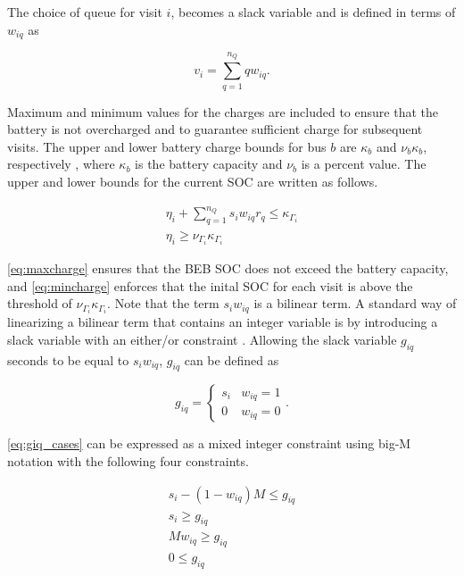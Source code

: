\documentclass[utf8]{FrontiersinHarvard}
\let\cite\citep                                       %
\begin{document}
The choice of queue for visit \(i\), becomes a slack variable and is defined in terms of \(w_{iq}\) as

\begin{equation}
    v_i = \sum_{q=1}^{n_Q} qw_{iq}.
\end{equation}

Maximum and minimum values for the charges are included to ensure that the battery is not overcharged and to guarantee
sufficient charge for subsequent visits. The upper and lower battery charge bounds for bus \(b\) are \(\kappa_b\) and \(\nu_b \kappa_b\),
respectively , where \(\kappa_b\) is the battery capacity and \(\nu_b\) is a percent value. The upper and lower bounds for the
current SOC are written as follows.

\begin{subequations}
    \label{subeq:pre_min_max}
\begin{align}
    \eta_i + \sum_{q=1}^{n_Q} s_i w_{iq} r_q \leq \kappa_{\Gamma_i} \label{eq:maxcharge}\\
    \eta_i \geq \nu_{\Gamma_i} \kappa_{\Gamma_i} \label{eq:mincharge}
\end{align}
\end{subequations}

\autoref{eq:maxcharge} ensures that the BEB SOC does not exceed the battery capacity, and \autoref{eq:mincharge}
enforces that the inital SOC for each visit is above the threshold of \(\nu_{\Gamma_i}\kappa_{\Gamma_i}\). Note that the term \(s_i w_{iq}\)
is a bilinear term. A standard way of linearizing a bilinear term that contains an integer variable is by introducing a
slack variable with an either/or constraint \cite{chen-2010-applied,rodriguez-2013-compar-asses}. Allowing the slack
variable \(g_{iq}\) seconds to be equal to \(s_i w_{iq}\), \(g_{iq}\) can be defined as

\begin{equation}
    \label{eq:giq_cases}
    g_{iq} =
    \begin{cases}
        s_i & w_{iq} = 1 \\
        0 & w_{iq} = 0
    \end{cases}.
\end{equation}

\autoref{eq:giq_cases} can be expressed as a mixed integer constraint using big-M notation with the following four
constraints.

\begin{subequations}
    \label{eq:slack_gain}
\begin{align}
    s_i - (1 - w_{iq})M \leq g_{iq}  \label{subeq:repgpgret} \\
    s_i \geq g_{iq}                 \label{subeq:repgples} \\
    Mw_{iq} \geq g_{iq}              \label{subeq:repgwgret} \\
    0 \leq g_{iq}                   \label{subeq:repgwles}
\end{align}
\end{subequations}
\end{document}
